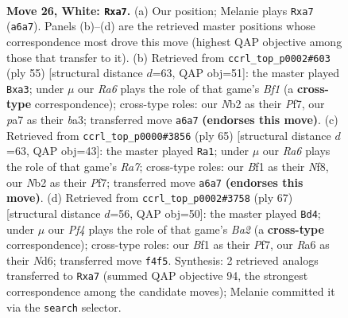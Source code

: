 \documentclass[11pt]{article}
\begin{document}
\clearpage

\begin{figure}[p]\centering
\begin{subfigure}{0.46\textwidth}\centering
\resizebox{\linewidth}{!}{%
\newchessgame
\chessboard[
  setfen={4b1k1/p4pp1/R3pn2/1p5p/3P1P2/1P4PP/1N2P3/2r2BK1 w - - 0 26},
  showmover=false,
  pgfstyle=straightmove, color=movearrow, markmove={a6-a7}
]}
\caption{}
\end{subfigure}\hfill
\begin{subfigure}{0.46\textwidth}\centering
\resizebox{\linewidth}{!}{%
\newchessgame
\chessboard[
  setfen={5bk1/2p2pp1/7p/pp6/3P4/BP3NP1/4rPKP/2R5 b - - 0 28},
  showmover=false,
  pgfstyle=straightmove, color=movearrow, markmove={f8-a3}
]}
\caption{}
\end{subfigure}
\\[4pt]
\begin{subfigure}{0.46\textwidth}\centering
\resizebox{\linewidth}{!}{%
\newchessgame
\chessboard[
  setfen={1R3nk1/5pp1/b2p4/3Pp2p/4P2P/4PK2/r1B3P1/4N3 b - - 0 33},
  showmover=false,
  pgfstyle=straightmove, color=movearrow, markmove={a2-a1}
]}
\caption{}
\end{subfigure}\hfill
\begin{subfigure}{0.46\textwidth}\centering
\resizebox{\linewidth}{!}{%
\newchessgame
\chessboard[
  setfen={8/bp2kpR1/p2n3p/P2P4/4N2P/1P3BP1/2r2PK1/8 b - - 2 34},
  showmover=false,
  pgfstyle=straightmove, color=movearrow, markmove={a7-d4}
]}
\caption{}
\end{subfigure}
\caption{\textbf{Move 26, White: \texttt{Rxa7}.} (a) Our position; Melanie plays \texttt{Rxa7} (\texttt{a6a7}). Panels (b)--(d) are the retrieved master positions whose correspondence most drove this move (highest QAP objective among those that transfer to it). (b) Retrieved from \texttt{ccrl\_top\_p0002\#603} (ply 55) [structural distance $d$=63, QAP obj=51]: the master played \texttt{Bxa3}; under $\mu$ our \emph{Ra6} plays the role of that game's \emph{Bf1} (a \textbf{cross-type} correspondence); cross-type roles: our \emph{N}b2 as their \emph{P}f7, our \emph{p}a7 as their \emph{b}a3; transferred move \texttt{a6a7} \textbf{(endorses this move)}. (c) Retrieved from \texttt{ccrl\_top\_p0000\#3856} (ply 65) [structural distance $d$=63, QAP obj=43]: the master played \texttt{Ra1}; under $\mu$ our \emph{Ra6} plays the role of that game's \emph{Ra7}; cross-type roles: our \emph{B}f1 as their \emph{N}f8, our \emph{N}b2 as their \emph{P}f7; transferred move \texttt{a6a7} \textbf{(endorses this move)}. (d) Retrieved from \texttt{ccrl\_top\_p0002\#3758} (ply 67) [structural distance $d$=56, QAP obj=50]: the master played \texttt{Bd4}; under $\mu$ our \emph{Pf4} plays the role of that game's \emph{Ba2} (a \textbf{cross-type} correspondence); cross-type roles: our \emph{B}f1 as their \emph{P}f7, our \emph{R}a6 as their \emph{N}d6; transferred move \texttt{f4f5}. Synthesis: 2 retrieved analogs transferred to \texttt{Rxa7} (summed QAP objective 94, the strongest correspondence among the candidate moves); Melanie committed it via the \texttt{search} selector.}
\label{fig:thought-m50}
\end{figure}
\end{document}
